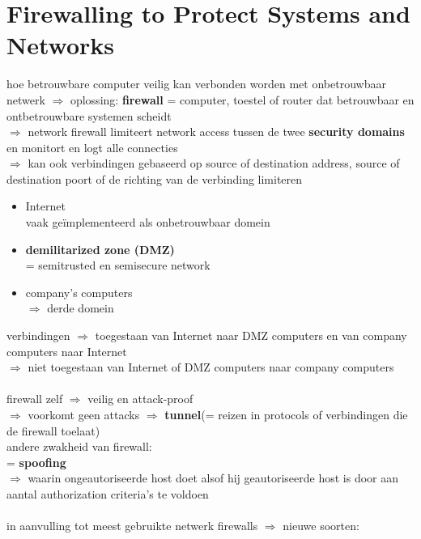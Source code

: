 \documentclass{report}
\begin{document}
\section{Firewalling to Protect Systems and Networks}
hoe betrouwbare computer veilig kan verbonden worden met onbetrouwbaar netwerk
$\Rightarrow$ oplossing: \textbf{firewall} = computer, toestel of router dat betrouwbaar en ontbetrouwbare systemen scheidt
\\$\Rightarrow$ network firewall limiteert network access tussen de twee \textbf{security domains} en monitort en logt alle connecties
\\$\Rightarrow$ kan ook verbindingen gebaseerd op source of destination address, source of destination poort of de richting van de verbinding limiteren
\\
\begin{itemize}
\item Internet
\\vaak ge\"implementeerd als onbetrouwbaar domein
\item \textbf{demilitarized zone (DMZ)}
\\= semitrusted en semisecure network
\item company's computers
\\$\Rightarrow$ derde domein
\end{itemize}
verbindingen $\Rightarrow$ toegestaan van Internet naar DMZ computers en van company computers naar Internet 
\\$\Rightarrow$ niet toegestaan van Internet of DMZ computers naar company computers
\\
\\firewall zelf $\Rightarrow$ veilig en attack-proof
\\$\Rightarrow$ voorkomt geen attacks $\Rightarrow$ \textbf{tunnel}(= reizen in protocols of verbindingen die de firewall toelaat)
\\andere zwakheid van firewall:
\\ = \textbf{spoofing}
\\$\Rightarrow$ waarin ongeautoriseerde host doet alsof hij geautoriseerde host is door aan aantal authorization criteria's te voldoen
\\
\\in aanvulling tot meest gebruikte netwerk firewalls $\Rightarrow$ nieuwe soorten:
\end{document}
